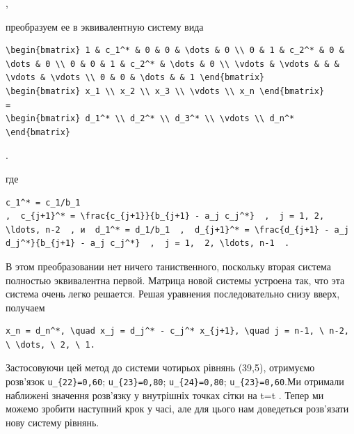 \documentclass[
  ukrainian,
]{article}
\begin{document}
,

преобразуем ее в эквивалентную систему вида

\begin{verbatim}
\begin{bmatrix} 1 & c_1^* & 0 & 0 & \dots & 0 \\ 0 & 1 & c_2^* & 0 & \dots & 0 \\ 0 & 0 & 1 & c_2^* & \dots & 0 \\ \vdots & \vdots & & & \vdots & \vdots \\ 0 & 0 & \dots & & 1 \end{bmatrix}
\begin{bmatrix} x_1 \\ x_2 \\ x_3 \\ \vdots \\ x_n \end{bmatrix}
=
\begin{bmatrix} d_1^* \\ d_2^* \\ d_3^* \\ \vdots \\ d_n^* \end{bmatrix}
\end{verbatim}

.

где

\begin{verbatim}
c_1^* = c_1/b_1
,  c_{j+1}^* = \frac{c_{j+1}}{b_{j+1} - a_j c_j^*}  ,  j = 1, 2, \ldots, n-2  , и  d_1^* = d_1/b_1  ,  d_{j+1}^* = \frac{d_{j+1} - a_j d_j^*}{b_{j+1} - a_j c_j^*}  ,  j = 1,  2, \ldots, n-1  .
\end{verbatim}

В этом преобразовании нет ничего таниственного, поскольку вторая система
полностью эквивалентна первой. Матрица новой системы устроена так, что
эта система очень легко решается. Решая уравнения последовательно снизу
вверх, получаем

\begin{verbatim}
x_n = d_n^*, \quad x_j = d_j^* - c_j^* x_{j+1}, \quad j = n-1, \ n-2, \ \dots, \ 2, \ 1.
\end{verbatim}

Застосовуючи цей метод до системи чотирьох рівнянь (39,5), отримуємо
розв'язок \texttt{u\_\{22\}=0,60}; \texttt{u\_\{23\}=0,80};
\texttt{u\_\{24\}=0,80}; \texttt{u\_\{23\}=0,60}.Ми отримали наближені
значення розв'язку у внутрішніх точках сітки на t=\Delta t . Тепер ми
можемо зробити наступний крок у часі, але для цього нам доведеться
розв'язати нову систему рівнянь.
\end{document}
